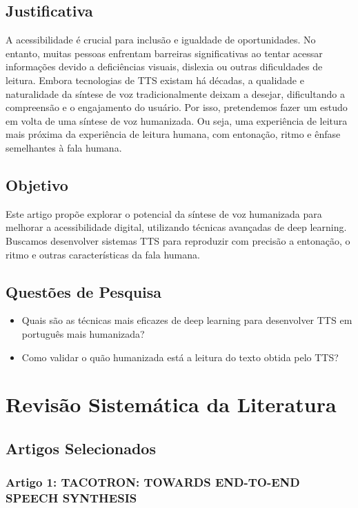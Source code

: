 \documentclass[a4paper,12pt]{article}
\begin{document}
		\subsection{Justificativa}
		A acessibilidade é crucial para inclusão e igualdade de oportunidades. No entanto, muitas pessoas enfrentam barreiras significativas ao tentar acessar informações devido a deficiências visuais, dislexia ou outras dificuldades de leitura. Embora tecnologias de TTS existam há décadas, a qualidade e naturalidade da síntese de voz tradicionalmente deixam a desejar, dificultando a compreensão e o engajamento do usuário. Por isso, pretendemos fazer um estudo em volta de uma síntese de voz humanizada. Ou seja, uma experiência de leitura mais próxima da experiência de leitura humana, com entonação, ritmo e ênfase semelhantes à fala humana.


		\subsection{Objetivo}
		Este artigo propõe explorar o potencial da síntese de voz humanizada para melhorar a acessibilidade digital, utilizando técnicas avançadas de deep learning. Buscamos desenvolver sistemas TTS para reproduzir com precisão a entonação, o ritmo e outras características da fala humana.

		\subsection{Questões de Pesquisa}
		\begin{itemize}
			\item Quais são as técnicas mais eficazes de deep learning para desenvolver TTS em português mais humanizada?
			\item Como validar o quão humanizada está a leitura do texto obtida pelo TTS?
		\end{itemize}
	\section{Revisão Sistemática da Literatura}
		\subsection{Artigos Selecionados}
			\subsubsection{Artigo 1: TACOTRON: TOWARDS END-TO-END SPEECH SYNTHESIS}
			
\end{document}
